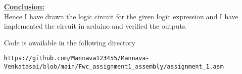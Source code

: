 \documentclass[10pt,a4paper,twocolumn]{report}
\begin{document}
\vspace{5mm}
\raggedright \textbf{\underline{Conclusion:}}\vspace{7mm}
\\ Hence I have drawn the logic circuit for the given logic expression and I have implemented the circuit in arduino and verified the outputs.
\vspace{10mm}
\\ \raggedright Code is awailable in the following directory \\
\begin{lstlisting}
https://github.com/Mannava123455/Mannava-Venkatasai/blob/main/Fwc_assignment1_assembly/assignment_1.asm
\end{lstlisting}
\end{document}
